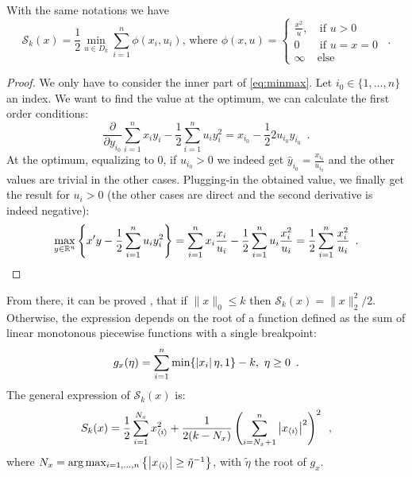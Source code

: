 \begin{proposition}\label{prop:Sfromphi} With the same notations we have 
\begin{equation}\mathcal{S}_k(x) = \frac{1}{2}\min_{u\in D_k} \sum_{i=1}^n \phi(x_i, u_i)\text{, where }
\phi(x,u)=\begin{cases}\frac{x^2}{u},&\ \text{if }u>0\\ 0&\ \text{if }u=x=0\\ \infty &\text{else} \end{cases}\enspace.\end{equation}
\end{proposition}
\begin{proof}
We only have to consider the inner part of \eqref{eq:minmax}. Let $i_0\in\{1,\dots,n\}$ an index. We want to find the value at the optimum, we can calculate the first order conditions:
\[ \frac{\partial}{\partial y_{i_0}} \sum_{i=1}^n x_iy_i -\frac{1}{2}\sum_{i=1}^n u_iy_i^2 = x_{i_0} - \frac{1}{2}2u_{i_0}y_{i_0}\enspace.\]
At the optimum, equalizing to $0$, if $u_{i_0}>0$ we indeed get $\hat y_{i_0} = \frac{x_{i_0}}{u_{i_0}}$ and the other values are trivial in the other cases. Plugging-in the obtained value, we finally get the result for $u_i>0$ (the other cases are direct and the second derivative is indeed negative):
\[\max_{y\in\mathbb{R}^n}\left\{x'y - \frac{1}{2}\sum_{i=1}^nu_iy_i^2\right\} = \sum_{i=1}^nx_i \frac{x_i}{u_i} - \frac{1}{2}\sum_{i=1}^n u_i \frac{x_i^2}{u_i} = \frac{1}{2}\sum_{i=1}^n \frac{x_i^2}{u_i}\enspace.\]
\end{proof}

From there, it can be proved \cite{beck}, that if $\|x\|_0\leq k$ then $\mathcal{S}_k(x)=\|x\|_2^2 /2$. Otherwise, the expression depends on the root of a function defined as the sum of linear monotonous piecewise functions with a single breakpoint:
\[g_x(\eta)=\sum_{i=1}^n \min\{\left|x_i\right|\eta,1\} - k,\ \eta\geq 0\enspace.\]
The general expression of $\mathcal{S}_k(x)$ is:
\begin{equation}
    S_k(x)=\frac{1}{2}\sum_{i=1}^{N_x} x_{\langle i \rangle}^2 + \frac{1}{2(k- N_x)}\left(\sum_{i=N_x+1}^n\left|x_{\langle i\rangle}\right|^2\right)^2\enspace,
\end{equation}
where $N_x=\arg\max_{i=1,\dots,n}\left\{\left|x_{\langle i\rangle}\right|\geq\tilde\eta ^{-1}\right\}$, with $\tilde \eta$ the root of $g_x$.